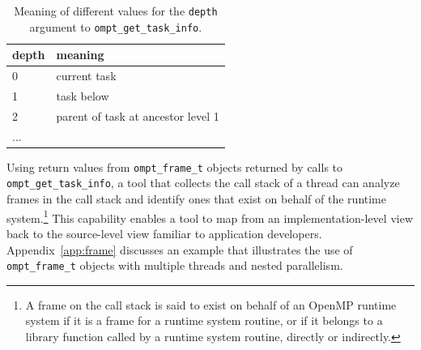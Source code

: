 \documentclass{article}
\begin{document}
\begin{table}
\centering
\begin{tabular}{|l|l|}
\hline
depth & meaning\\\hline
 0 & current task  \\\hline
1 & task below  \\\hline
2 &  parent of task at ancestor level 1 \\\hline
... & \\\hline
\end{tabular}
\caption{Meaning of different  values for the {\tt depth} argument to {\tt ompt\_get\_task\_info}.}
\label{tab:task-ancestor}
\end{table}

Using return values from  \verb|ompt_frame_t| objects returned by calls to  \verb|ompt_get_task_info|, a tool that collects the call stack of a thread can analyze  frames in the call stack and identify ones that exist on behalf of the runtime system.\footnote{A frame on the call stack is said to exist on behalf of an OpenMP runtime system if it is a frame for a runtime system routine, or if it belongs to a library function called by a runtime system routine, directly or indirectly.} 
This capability enables a tool to map from an implementation-level view back to the source-level view familiar to application developers. 
Appendix~\ref{app:frame} discusses  an example that illustrates the use of \verb|ompt_frame_t| objects with multiple threads and nested parallelism.

\end{document}
